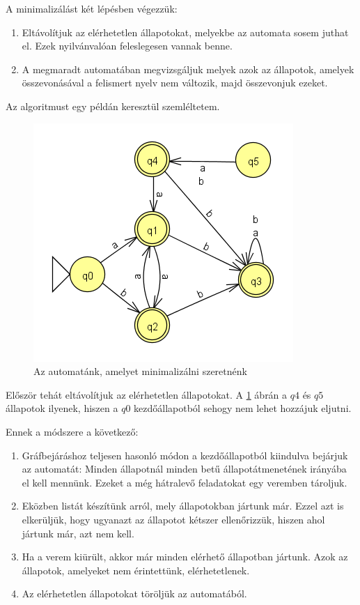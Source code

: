 \documentclass[12pt]{report}
\theoremstyle{definition}
\begin{document}
A minimalizálást két lépésben végezzük:
\begin{enumerate}
\item Eltávolítjuk az elérhetetlen állapotokat, melyekbe az automata sosem juthat el. Ezek nyilvánvalóan feleslegesen vannak benne.
\item A megmaradt automatában megvizsgáljuk melyek azok az állapotok, amelyek összevonásával a felismert nyelv nem változik, majd összevonjuk ezeket.
\end{enumerate}

Az algoritmust egy példán keresztül szemléltetem.

\begin{figure}[H]
\centering
\includegraphics[scale=0.8]{min_kezdo.png}
\caption{\label{mini1} Az automatánk, amelyet minimalizálni szeretnénk}
\end{figure}

Először tehát eltávolítjuk az elérhetetlen állapotokat. A \ref{mini1} ábrán a $q4$ és $q5$ állapotok ilyenek, hiszen a $q0$ kezdőállapotból sehogy nem lehet hozzájuk eljutni.

Ennek a módszere a következő:
\begin{enumerate}
\item Gráfbejáráshoz teljesen hasonló módon a kezdőállapotból kiindulva bejárjuk az 
automatát: Minden állapotnál minden betű állapotátmenetének irányába el kell mennünk. Ezeket a még hátralevő feladatokat egy veremben tároljuk.
\item Eközben listát készítünk arról, mely állapotokban jártunk már. Ezzel azt is elkerüljük, hogy ugyanazt az állapotot kétszer ellenőrizzük, hiszen ahol jártunk már, azt nem kell.
\item Ha a verem kiürült, akkor már minden elérhető állapotban jártunk. Azok az állapotok, amelyeket nem érintettünk, elérhetetlenek.
\item Az elérhetetlen állapotokat töröljük az automatából.
\end{enumerate}
\end{document}
